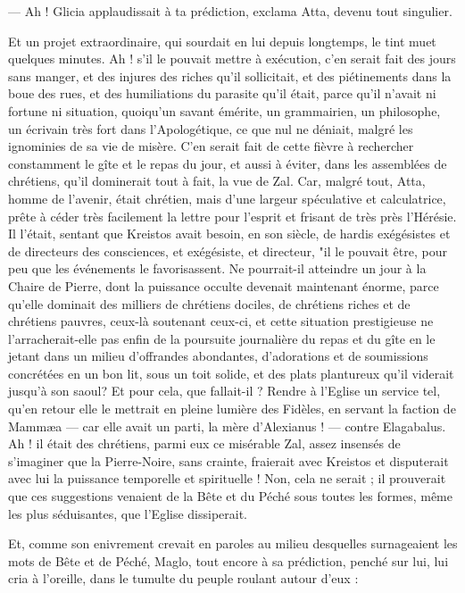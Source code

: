 \documentclass[a4paper, 11pt, oneside, polutonikogreek, french]{article}
\begin{document}
--- Ah ! Glicia applaudissait à ta prédiction, exclama Atta, devenu tout singulier.

Et un projet extraordinaire, qui sourdait en lui depuis longtemps, le tint muet quelques minutes. Ah ! s'il le pouvait mettre à exécution, c'en serait fait des jours sans manger, et des injures des riches qu'il sollicitait, et des piétinements dans la boue des rues, et des humiliations du parasite qu'il était, parce qu'il n'avait ni fortune ni situation, quoiqu'un savant émérite, un grammairien, un philosophe, un écrivain très fort dans l'Apologétique, ce que nul ne déniait, malgré les ignominies de sa vie de misère. C'en serait fait de cette fièvre à rechercher constamment le gîte et le repas du jour, et aussi à éviter, dans les assemblées de chrétiens, qu'il dominerait tout à fait, la vue de Zal. Car, malgré tout, Atta, homme de l'avenir, était chrétien, mais d'une largeur spéculative et calculatrice, prête à céder très facilement la lettre pour l'esprit et frisant de très près l'Hérésie. Il l'était, sentant que Kreistos avait besoin, en son siècle, de hardis exégésistes et de directeurs des consciences, et exégésiste, et directeur, "il le pouvait être, pour peu que les événements le favorisassent. Ne pourrait-il atteindre un jour à la Chaire de Pierre, dont la puissance occulte devenait maintenant énorme, parce qu'elle dominait des milliers de chrétiens dociles, de chrétiens riches et de chrétiens pauvres, ceux-là soutenant ceux-ci, et cette situation prestigieuse ne l'arracherait-elle pas enfin de la poursuite journalière du repas et du gîte en le jetant dans un milieu d'offrandes abondantes, d'adorations et de soumissions concrétées en un bon lit, sous un toit solide, et des plats plantureux qu'il viderait jusqu'à son saoul? Et pour cela, que fallait-il ? Rendre à l'Eglise un service tel, qu'en retour elle le mettrait en pleine lumière des Fidèles, en servant la faction de Mammæa --- car elle avait un parti, la mère d'Alexianus ! --- contre Elagabalus. Ah ! il était des chrétiens, parmi eux ce misérable Zal, assez insensés de s'imaginer que la Pierre-Noire, sans crainte, fraierait avec Kreistos et disputerait avec lui la puissance temporelle et spirituelle ! Non, cela ne serait ; il prouverait que ces suggestions venaient de la Bête et du Péché sous toutes les formes, même les plus séduisantes, que l'Eglise dissiperait.

Et, comme son enivrement crevait en paroles au milieu desquelles surnageaient les mots de Bête et de Péché, Maglo, tout encore à sa prédiction, penché sur lui, lui cria à l'oreille, dans le tumulte du peuple roulant autour d'eux :
\end{document}
